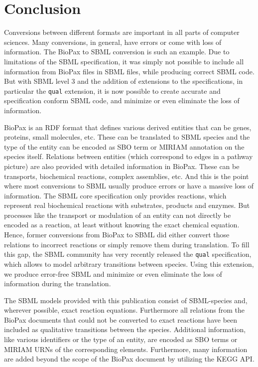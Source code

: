 \documentclass{bioinfo}
\begin{document}
\section{Conclusion}
Conversions between different formats are important in all parts of computer sciences. Many conversions, in general, have errors or come with loss of information. The BioPax to SBML conversion is such an example. Due to limitations of the SBML specification, it was simply not possible to include all information from BioPax files in SBML files, while producing correct SBML code. But with SBML level 3 and the addition of extensions to the specifications, in particular the \texttt{qual} extension, it is now possible to create accurate and specification conform SBML code, and minimize or even eliminate the loss of information.

BioPax is an RDF format that defines various derived entities that can be genes, proteins, small molecules, etc. These can be translated to SBML species and the type of the entity can be encoded as SBO term or MIRIAM annotation on the species itself. Relations between entities (which correspond to edges in a pathway picture) are also provided with detailed information in BioPax. These can be transports, biochemical reactions, complex assemblies, etc. And this is the point where most conversions to SBML usually produce errors or have a massive loss of information. The SBML core specification only provides reactions, which represent real biochemical reactions with substrates, products and enzymes. But processes like the transport or modulation of an entity can not directly be encoded as a reaction, at least without knowing the exact chemical equation. Hence, former conversions from BioPax to SBML did either convert those relations to incorrect reactions or simply remove them during translation. To fill this gap, the SBML community has very recently released the \texttt{qual} specification, which allows to model arbitrary transitions between species. Using this extension, we produce error-free SBML and minimize or even eliminate the loss of information during the translation.

The SBML models provided with this publication consist of SBML-species and, wherever possible, exact reaction equations. Furthermore all relations from the BioPax documents that could not be converted to exact reactions have been included as qualitative transitions between the species. Additional information, like various identifiers or the type of an entity, are encoded as SBO terms or MIRIAM URNs of the corresponding elements. Furthermore, many information are added beyond the scope of the BioPax document by utilizing the KEGG API.
\end{document}

